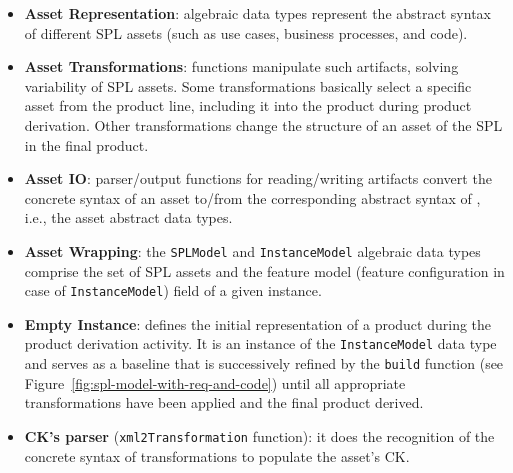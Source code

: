 \begin{itemize}
  \item \textbf{Asset Representation}: algebraic data types represent the abstract syntax of different SPL assets (such as use cases, business processes, and code).

  \item \textbf{Asset Transformations}: functions manipulate such artifacts, solving variability of SPL assets. Some transformations
  basically select a specific asset from the product line, including it into the product during product derivation. Other transformations
  change the structure of an asset of the SPL in the final product.

  \item \textbf{Asset IO}: parser/output functions for reading/writing artifacts convert the concrete syntax of an asset to/from the corresponding
  abstract syntax of \hpl{}, i.e., the asset abstract data types.

  \item \textbf{Asset Wrapping}: the \texttt{SPLModel} and \texttt{InstanceModel} algebraic data types comprise the set of SPL assets and the feature model (feature configuration in case of \texttt{InstanceModel}) field of a given \hpl{} instance.

  \item \textbf{Empty Instance}: defines the initial representation of a product
  during the product derivation activity. It is an instance of the \texttt{InstanceModel} data type and serves
  as a baseline that is successively refined by the \texttt{build} function (see Figure~\ref{fig:spl-model-with-req-and-code})
  until all appropriate transformations have been applied and the final product derived.


  \item \textbf{CK's parser} (\texttt{xml2Transformation} function): it does the recognition of the concrete syntax of
   transformations to populate the asset's CK.

\end{itemize}

